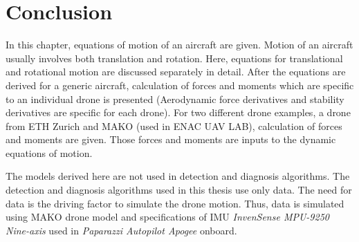 

\section{Conclusion}
In this chapter, equations of motion of an aircraft are given. 
Motion of an aircraft usually involves both translation and rotation. 
Here, equations for translational and rotational motion are discussed separately in detail.
After the equations are derived for a generic aircraft, calculation of forces and moments which are specific to an individual drone is presented (Aerodynamic force derivatives and stability derivatives are specific for each drone). For two different drone examples, a drone from ETH Zurich and MAKO (used in ENAC UAV LAB), calculation of forces and moments are given.
Those forces and moments are inputs to the dynamic equations of motion. 

The models derived here are not used in detection and diagnosis algorithms. 
The detection and diagnosis algorithms used in this thesis use only data. 
The need for data is the driving factor to simulate the drone motion. 
Thus, data is simulated using MAKO drone model and specifications of IMU \emph{InvenSense MPU-9250 Nine-axis} used in \emph{Paparazzi Autopilot Apogee} onboard. 
 

